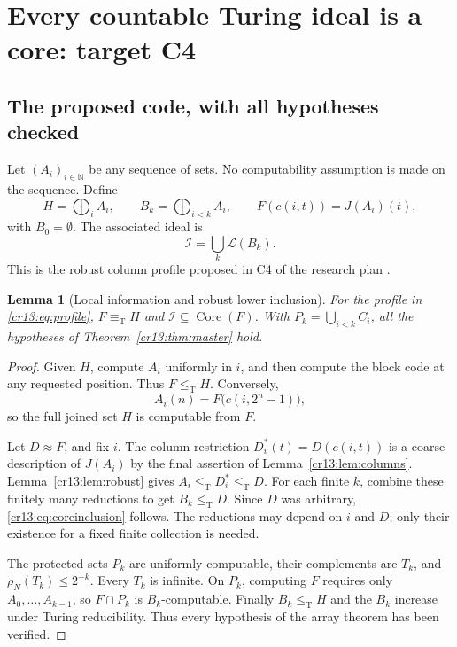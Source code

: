 \documentclass[11pt,letterpaper]{article}
\newtheorem{lemma}[theorem]{Lemma}
\theoremstyle{definition}
\theoremstyle{remark}\newtheorem{remark}[theorem]{Remark}
\numberwithin{equation}{section}
\newcommand{\N}{\mathbb N}
\newcommand{\leT}{\leq_{\mathrm T}}
\newcommand{\eqT}{\equiv_{\mathrm T}}
\newcommand{\Low}{\mathcal L}
\newcommand{\Core}{\operatorname{Core}}
\newcommand{\Ideal}{\mathcal I}
\begin{document}
\section{Every countable Turing ideal is a core: target C4}
\label{cr13:sec:ideals}
\subsection{The proposed code, with all hypotheses checked}
Let $(A_i)_{i\in\N}$ be any sequence of sets. No computability assumption is made on the sequence. Define
\begin{equation}\label{cr13:eq:profile}
 H=\bigoplus_iA_i,\qquad B_k=\bigoplus_{i<k}A_i,
 \qquad F(c(i,t))=J(A_i)(t),
\end{equation}
with $B_0=\emptyset$. The associated ideal is
\begin{equation}\label{cr13:eq:profileideal}
                         \Ideal=\bigcup_k\Low(B_k).
\end{equation}
This is the robust column profile proposed in C4 of the research plan \cite{Plan}.

\begin{lemma}[Local information and robust lower inclusion]\label{cr13:lem:profile}
For the profile in \eqref{cr13:eq:profile}, $F\eqT H$ and $\Ideal\subseteq\Core(F)$. With $P_k=\bigcup_{i<k}C_i$, all the hypotheses of Theorem~\ref{cr13:thm:master} hold.
\end{lemma}
\begin{proof}
Given $H$, compute $A_i$ uniformly in $i$, and then compute the block code at any requested position. Thus $F\leT H$. Conversely,
\[
                     A_i(n)=F\bigl(c(i,2^n-1)\bigr),
\]
so the full joined set $H$ is computable from $F$.

Let $D\approx F$, and fix $i$. The column restriction $D_i^*(t)=D(c(i,t))$ is a coarse description of $J(A_i)$ by the final assertion of Lemma~\ref{cr13:lem:columns}. Lemma~\ref{cr13:lem:robust} gives $A_i\leT D_i^*\leT D$. For each finite $k$, combine these finitely many reductions to get $B_k\leT D$. Since $D$ was arbitrary, \eqref{cr13:eq:coreinclusion} follows. The reductions may depend on $i$ and $D$; only their existence for a fixed finite collection is needed.

The protected sets $P_k$ are uniformly computable, their complements are $T_k$, and $\rho_N(T_k)\le2^{-k}$. Every $T_k$ is infinite. On $P_k$, computing $F$ requires only $A_0,\ldots,A_{k-1}$, so $F\cap P_k$ is $B_k$-computable. Finally $B_k\leT H$ and the $B_k$ increase under Turing reducibility. Thus every hypothesis of the array theorem has been verified.
\end{proof}
\end{document}
